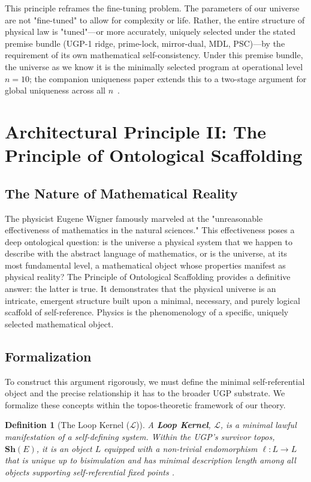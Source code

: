 \documentclass[12pt]{article}
\newtheorem{definition}[theorem]{Definition}
\newcommand{\scL}{\mathscr{L}}
\begin{document}
This principle reframes the fine-tuning problem. The parameters of our universe are not "fine-tuned" to allow for complexity or life. Rather, the entire structure of physical law is "tuned"—or more accurately, uniquely selected under the stated premise bundle (UGP-1 ridge, prime-lock, mirror-dual, MDL, PSC)—by the requirement of its own mathematical self-consistency. Under this premise bundle, the universe as we know it is the minimally selected program at operational level $n=10$; the companion uniqueness paper extends this to a two-stage argument for global uniqueness across all $n$~\cite{spivack2025ugp_uniqueness}.

\section{Architectural Principle II: The Principle of Ontological Scaffolding}
\label{sec:ontological_scaffolding}

\subsection{The Nature of Mathematical Reality}
The physicist Eugene Wigner famously marveled at the "unreasonable effectiveness of mathematics in the natural sciences." This effectiveness poses a deep ontological question: is the universe a physical system that we happen to describe with the abstract language of mathematics, or is the universe, at its most fundamental level, a mathematical object whose properties manifest as physical reality? The Principle of Ontological Scaffolding provides a definitive answer: the latter is true. It demonstrates that the physical universe is an intricate, emergent structure built upon a minimal, necessary, and purely logical scaffold of self-reference. Physics is the phenomenology of a specific, uniquely selected mathematical object.

\subsection{Formalization}
To construct this argument rigorously, we must define the minimal self-referential object and the precise relationship it has to the broader UGP substrate. We formalize these concepts within the topos-theoretic framework of our theory.

\begin{definition}[The Loop Kernel ($\scL$)]
\label{def:loop_kernel}
A \textbf{Loop Kernel}, $\scL$, is a minimal lawful manifestation of a self-defining system. Within the UGP's survivor topos, $\mathbf{Sh}(E)$, it is an object $L$ equipped with a non-trivial endomorphism $\ell: L \to L$ that is unique up to bisimulation and has minimal description length among all objects supporting self-referential fixed points \cite{Spivack2025UGP}.
\end{definition}
\end{document}

